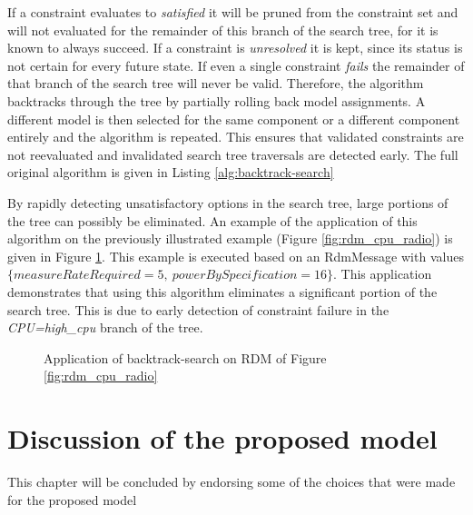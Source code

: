 If a constraint evaluates to \emph{satisfied} it will be pruned from the constraint set and will not evaluated for the remainder of this branch of the search tree, for it is known to always succeed. If a constraint is \emph{unresolved} it is kept, since its status is not certain for every future state. If even a single constraint \emph{fails} the remainder of that branch of the search tree will never be valid. Therefore, the algorithm backtracks through the tree by partially rolling back model assignments. A different model is then selected for the same component or a different component entirely and the algorithm is repeated. This ensures that validated constraints are not reevaluated and invalidated search tree traversals are detected early. The full original algorithm is given in Listing \ref{alg:backtrack-search}

By rapidly detecting unsatisfactory options in the search tree, large portions of the tree can possibly be eliminated. An example of the application of this algorithm on the previously illustrated example (Figure \ref{fig:rdm_cpu_radio}) is given in Figure \ref{fig:search_cpu_radio}. This example is executed based on an RdmMessage with values $\{measureRateRequired=5,\ powerBySpecification=16\}$. This application demonstrates that using this algorithm eliminates a significant portion of the search tree. This is due to early detection of constraint failure in the \emph{CPU=high\_cpu} branch of the tree.



\begin{figure}

\caption{Application of backtrack-search on RDM of Figure \ref{fig:rdm_cpu_radio}}
\label{fig:search_cpu_radio}
\end{figure}

\section{Discussion of the proposed model}
This chapter will be concluded by endorsing some of the choices that were made for the proposed model
